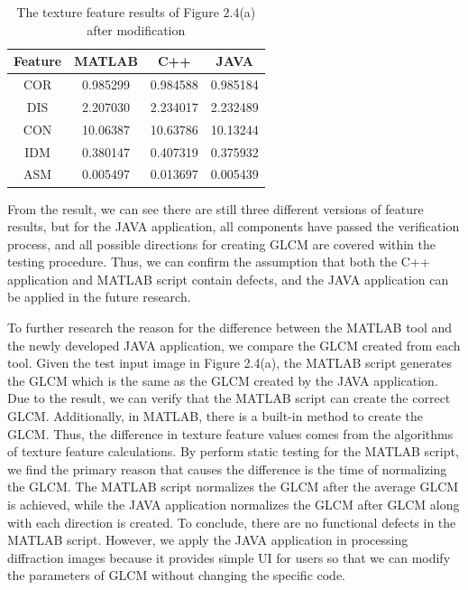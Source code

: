 \begin{table}[!t]
\begin{center}
\begin{tabular}{||c c c c||}
\hline
Feature & MATLAB & C++ & JAVA\\[0.7ex]
\hline\hline
COR & 0.985299 & 0.984588 & 0.985184 \\
DIS & 2.207030 & 2.234017 & 2.232489\\
CON & 10.06387 & 10.63786 & 10.13244 \\
IDM & 0.380147 & 0.407319 & 0.375932 \\
ASM & 0.005497 & 0.013697 & 0.005439\\
\hline
\end{tabular}
\caption{The texture feature results of Figure 2.4(a) after modification}
\end{center}
\end{table}
From the result, we can see there are still three different versions of feature results, but for the JAVA application, all components have passed the verification process, and all possible directions for creating GLCM are covered within the testing procedure. Thus, we can confirm the assumption that both the C++ application and MATLAB script contain defects, and the JAVA application can be applied in the future research.\par
To further research the reason for the difference between the MATLAB tool and the newly developed JAVA application, we compare the GLCM created from each tool. Given the test input image in Figure 2.4(a), the MATLAB script generates the GLCM which is the same as the GLCM created by the JAVA application. Due to the result, we can verify that the MATLAB script can create the correct GLCM. Additionally, in MATLAB, there is a built-in method to create the GLCM. Thus, the difference in texture feature values comes from the algorithms of texture feature calculations. By perform static testing for the MATLAB script, we find the primary reason that causes the difference is the time of normalizing the GLCM. The MATLAB script normalizes the GLCM after the average GLCM is achieved, while the JAVA application normalizes the GLCM after GLCM along with each direction is created. To conclude, there are no functional defects in the MATLAB script. However, we apply the JAVA application in processing diffraction images because it provides simple UI for users so that we can modify the parameters of GLCM without changing the specific code.  

